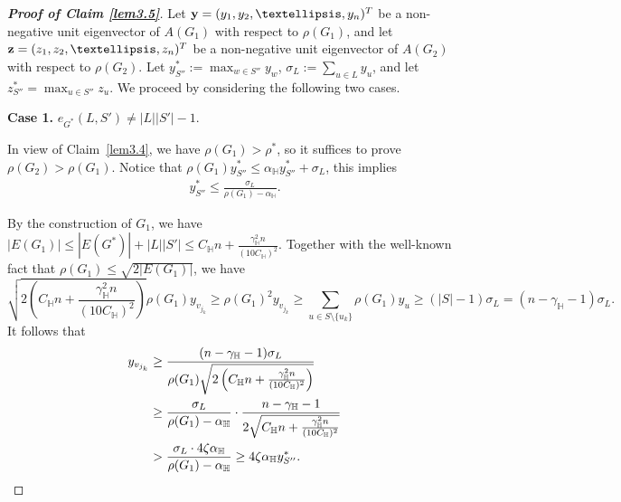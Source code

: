 \documentclass[10pt,a4paper]{amsart}
\begin{document}
\begin{proof}[\bf Proof of Claim \ref{lem3.5}]
    Let ${\bf y}=(y_1,y_2,\ldots,y_n)^{T}$ be a non-negative unit eigenvector of 
$A(G_1)$ with respect to $\rho(G_1)$, and let ${\bf z}=(z_1,z_2,\ldots, z_n)^T$ be a non-negative unit eigenvector of $A(G_2)$ with respect to $\rho(G_2)$. Let %
    $y_{S''}^*:=\max_{w\in S''}y_w$,  $\sigma_L:=\sum_{u\in L}y_u$, and let $z_{S''}^*=\max_{u\in S''}z_u$. 
We proceed by  considering the following two cases.

{\bf Case 1.} $e_{G^*}(L,S')\neq |L||S'|-1$.
    
    In view of Claim~\ref{lem3.4}, we have $\rho(G_1)>\rho^*$, so it suffices to prove $\rho(G_2)>\rho(G_1)$. Notice that $\rho(G_1)y_{S''}^*\leq \alpha_{\mathbb{H}}y_{S''}^*+\sigma_L$, this implies 
    \begin{align}\label{ys}
        y_{S''}^*\leq \frac{\sigma_L}{\rho(G_1)-\alpha_{\mathbb{H}}}.
    \end{align}
  

By the construction of
$G_1$, we have $|E(G_1)|\leq |E(G^*)|+|L||S'|\leq C_\mathbb{H} n+\frac{\gamma_\mathbb{H}^2n}{(10C_\mathbb{H})^2}$. Together with the well-known fact that 
$\rho(G_1)\leq \sqrt{2|E(G_1)|}$, we have 
$$
\sqrt{2\left(C_\mathbb{H} n+\frac{\gamma_\mathbb{H}^2n}{(10C_\mathbb{H})^2}\right)}\rho(G_1)y_{v_{j_k}}\geq \rho(G_1)^2y_{v_{j_k}}\geq \sum_{u\in S\setminus \{u_k\}}\rho(G_1)y_u\geq (|S|-1)\sigma_L=(n-\gamma_\mathbb{H}-1)\sigma_L.
$$
It follows that 
\begin{align}\notag
    y_{v_{j_k}}&\geq \frac{(n-\gamma_\mathbb{H}-1)\sigma_L}{\rho(G_1)\sqrt{2\left(C_\mathbb{H} n+\frac{\gamma_\mathbb{H}^2n}{(10C_\mathbb{H})^2}\right)}}\\\notag
    &\geq \frac{\sigma_L}{\rho(G_1)-\alpha_{\mathbb{H}}}\cdot\frac{n-\gamma_\mathbb{H}-1}{2\sqrt{C_\mathbb{H} n+\frac{\gamma_\mathbb{H}^2n}{(10C_\mathbb{H})^2}}}\\\label{eq:4.1}
    &>\frac{\sigma_L\cdot 4\zeta\alpha_{\mathbb{H}}}{\rho(G_1)-\alpha_{\mathbb{H}}}\geq 4\zeta\alpha_{\mathbb{H}}y_{S''}^*.
\end{align}


\end{proof}
\end{document}
